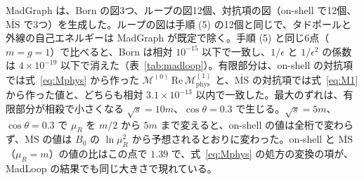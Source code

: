 \documentclass[a4paper,10pt]{ltjsarticle}
\begin{document}
MadGraph は、Born の図3つ、ループの図12個、対抗項の図（on-shell で12個、$\overline{\mathrm{MS}}$ で3つ）を生成した。ループの図は手順 (5) の12個と同じで、タドポールと外線の自己エネルギーは MadGraph が既定で除く。手順 (5) と同じ6点（$m=g=1$）で比べると、Born は相対 $10^{-15}$ 以下で一致し、$1/\epsilon$ と $1/\epsilon^2$ の係数は $4\times10^{-19}$ 以下で消えた（表~\ref{tab:madloop}）。有限部分は、on-shell の対抗項では式~\eqref{eq:Mphys} から作った $\mathcal{M}^{(0)}\,\mathrm{Re}\,\mathcal{M}^{(1)}_{\mathrm{phys}}$ と、$\overline{\mathrm{MS}}$ の対抗項では式~\eqref{eq:M1} から作った値と、どちらも相対 $3.1\times10^{-13}$ 以内で一致した。最大のずれは、有限部分が相殺で小さくなる $\sqrt s=10m$、$\cos\theta=0.3$ で生じる。$\sqrt s=5m$、$\cos\theta=0.3$ で $\mu_R$ を $m/2$ から $5m$ まで変えると、on-shell の値は全桁で変わらず、$\overline{\mathrm{MS}}$ の値は $B_0$ の $\ln\mu_R^2$ から予想されるとおりに変わった。on-shell と $\overline{\mathrm{MS}}$（$\mu_R=m$）の値の比はこの点で $1.39$ で、式~\eqref{eq:Mphys} の処方の変換の項が、MadLoop の結果でも同じ大きさで現れている。
\end{document}
